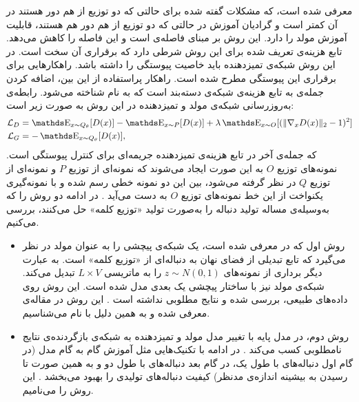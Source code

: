  \cite{Arjovsky17Wasserstein}
 معرفی شده است، که مشکلات گفته شده برای حالتی که دو توزیع از هم دور هستند در آن کمتر است و گرادیان آموزش در حالتی که دو توزیع از هم دور هم هستند، قابلیت آموزش مولد را دارد. این روش بر مبنای فاصله‌ی
است و این فاصله را کاهش می‌دهد. تابع هزینه‌ی تعریف شده برای این روش شرطی دارد که برقراری آن سخت است. در این روش شبکه‌ی تمیزدهنده باید خاصیت پیوستگی
را داشته باشد. راهکار‌هایی برای برقراری این پیوستگی مطرح شده است. راهکار پراستفاده از این بین، اضافه کردن جمله‌ی
به تابع هزینه‌ی شبکه‌ی دسته‌بند است که به نام
  \cite{Gulrajaniy17ImprovedWasserstein}
  شناخته می‌شود. رابطه‌ی به‌روزرسانی شبکه‌ی مولد و تمیزدهنده در این روش به صورت زیر است:
\begin{equation}
\begin{split}
\mathcal{L}_D &=\ME_{x \sim Q_\theta}[D(x)] - \ME_{x \sim P} [D(x)] + \lambda \ME_{x \sim O} [(\lVert \nabla_x D(x) \rVert_2 -1)^2] \\
\mathcal{L}_G &= -\ME_{x \sim Q_\theta}[D(x)],
\end{split}
\end{equation}
که جمله‌ی آخر در تابع هزینه‌ی تمیزدهنده جریمه‌ای برای کنترل پیوستگی
است.
نمونه‌های توزیع $O$ به این صورت ایجاد می‌شوند که  نمونه‌ای از توزیع $P$ و نمونه‌ای از توزیع $Q$ در نظر گرفته می‌شود، بین این دو نمونه خطی رسم شده و با نمونه‌گیری یکنواخت از این خط نمونه‌های توزیع $O$ به دست می‌آید
  \cite{Gulrajaniy17ImprovedWasserstein}.
  \newline
  در ادامه دو روش را که به‌وسیله‌ی
  مساله تولید دنباله را به‌صورت تولید «توزیع کلمه» حل می‌کنند، بررسی می‌کنیم.
\begin{itemize}
	\item 
	  روش اول که در 
	  \cite{Gulrajaniy17ImprovedWasserstein}
	  معرفی شده است، یک شبکه‌ی پیچشی را به عنوان مولد در نظر می‌گیرد که تابع تبدیلی از فضای نهان به دنباله‌ای از «توزیع کلمه» است. به عبارت دیگر برداری از نمونه‌های 
	  $z \sim N(0,1)$
	  را به ماتریسی
	   $L\times V$
	   تبدیل می‌کند. شبکه‌ی مولد نیز با ساختار پیچشی یک بعدی مدل شده است. این روش روی داد‌ه‌های طبیعی، بررسی شده و نتایج مطلوبی نداشته است
	   \cite{Gulrajaniy17ImprovedWasserstein,press2017langwasserstein, Stanisalu18AccEvaluation}.
	   این روش در مقاله‌ی 
	   معرفی شده و به همین دلیل با نام
	   می‌شناسیم.
	\item
	روش دوم، در مدل پایه با تغییر مدل مولد و تمیزدهنده به شبکه‌ی بازگردنده‌ی
	\cite{Cho14GRU}
	نتایج نامطلوبی کسب می‌کند
	\cite{press2017langwasserstein}.
	در ادامه با تکنیک‌هایی مثل آموزش گام به گام مدل (در گام اول دنباله‌های با طول یک، در گام بعد دنباله‌های با طول دو و به همین صورت تا رسیدن به بیشینه اندازه‌ی مدنظر) کیفیت دنباله‌های تولیدی را بهبود می‌بخشد
		\cite{press2017langwasserstein}.
		این روش را 
		می‌نامیم.
\end{itemize}
